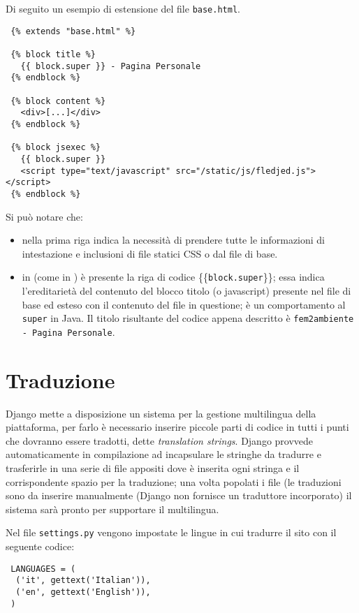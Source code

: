 Di seguito un esempio di estensione del file \texttt{base.html}.

\begin{footnotesize}
\begin{verbatim}
 {% extends "base.html" %}
 
 {% block title %}
   {{ block.super }} - Pagina Personale
 {% endblock %}
 
 {% block content %}
   <div>[...]</div>
 {% endblock %}
 
 {% block jsexec %}
   {{ block.super }}
   <script type="text/javascript" src="/static/js/fledjed.js"></script>
 {% endblock %}
\end{verbatim}
\end{footnotesize}

Si può notare che:
\begin{itemize}
 \item nella prima riga  indica la necessità di prendere tutte le informazioni di intestazione e inclusioni di file statici CSS o {\js} dal file di base.
 \item in  (come in ) è presente la riga di codice \{\{\texttt{block.super}\}\}; essa indica l'ereditarietà del contenuto del blocco titolo (o javascript) presente nel file di base ed esteso con il contenuto del file in questione; è un comportamento al \texttt{super} in Java. Il titolo risultante del codice appena descritto è \texttt{fem2ambiente - Pagina Personale}.
\end{itemize}


\section*{Traduzione}
\label{app:traduzione}
Django mette a disposizione un sistema per la gestione multilingua della piattaforma, per farlo è necessario inserire piccole parti di codice in tutti i punti che dovranno essere tradotti, dette \emph{translation strings}. Django provvede automaticamente in compilazione ad incapsulare le stringhe da tradurre e trasferirle in una serie di file appositi dove è inserita ogni stringa e il corrispondente spazio per la traduzione; una volta popolati i file (le traduzioni sono da inserire manualmente (Django non fornisce un traduttore incorporato) il sistema sarà pronto per supportare il multilingua.

Nel file \texttt{settings.py} vengono impostate le lingue in cui tradurre il sito con il seguente codice:
\begin{footnotesize}
\begin{verbatim}
 LANGUAGES = (
  ('it', gettext('Italian')),
  ('en', gettext('English')),
 )
\end{verbatim}
\end{footnotesize}

